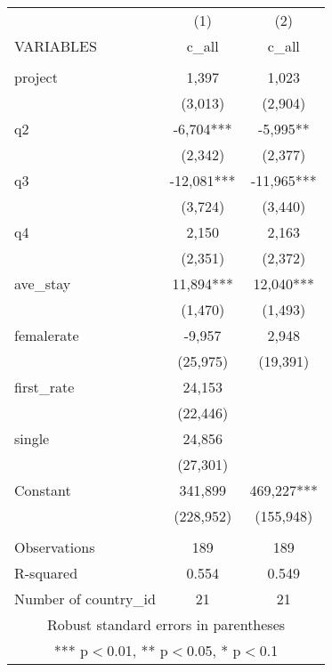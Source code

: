 \documentclass[]{article}
\begin{document}
\begin{tabular}{lcc} \hline
 & (1) & (2) \\
VARIABLES & c\_all & c\_all \\ \hline
 &  &  \\
project & 1,397 & 1,023 \\
 & (3,013) & (2,904) \\
q2 & -6,704*** & -5,995** \\
 & (2,342) & (2,377) \\
q3 & -12,081*** & -11,965*** \\
 & (3,724) & (3,440) \\
q4 & 2,150 & 2,163 \\
 & (2,351) & (2,372) \\
ave\_stay & 11,894*** & 12,040*** \\
 & (1,470) & (1,493) \\
femalerate & -9,957 & 2,948 \\
 & (25,975) & (19,391) \\
first\_rate & 24,153 &  \\
 & (22,446) &  \\
single & 24,856 &  \\
 & (27,301) &  \\
Constant & 341,899 & 469,227*** \\
 & (228,952) & (155,948) \\
 &  &  \\
Observations & 189 & 189 \\
R-squared & 0.554 & 0.549 \\
 Number of country\_id & 21 & 21 \\ \hline
\multicolumn{3}{c}{ Robust standard errors in parentheses} \\
\multicolumn{3}{c}{ *** p$<$0.01, ** p$<$0.05, * p$<$0.1} \\
\end{tabular}
\end{document}
